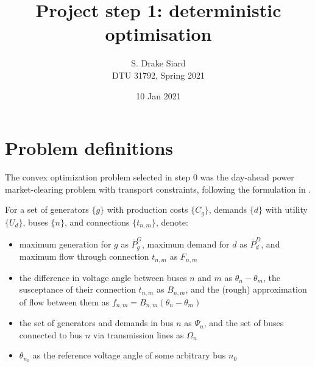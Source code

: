 \documentclass[11pt,a4paper]{article}
\title{\textbf{Project step 1: deterministic optimisation}}
\author{S. Drake Siard\\
DTU 31792, Spring 2021}
\date{10 Jan 2021}
\numberwithin{equation}{section}
\begin{document}
\newcommand{\pd}{\ensuremath{p^D_d}}
\newcommand{\ud}{\ensuremath{U_d}}
\newcommand{\pg}{\ensuremath{p^G_g}}
\newcommand{\cg}{\ensuremath{C_g}}
\newcommand{\bnm}{\ensuremath{B_{n,m}}}
\newcommand{\tnm}{\ensuremath{t_{n,m}}}
\newcommand{\fnm}{\ensuremath{f_{n,m}}}
\newcommand{\FNM}{\ensuremath{F_{n,m}}}
\newcommand{\PG}{\ensuremath{\overline{P}^G_g}}
\newcommand{\PD}{\ensuremath{\overline{P}^D_d}}

\newcommand{\mudup}{\ensuremath{\overline{\mu}_d^D}}
\newcommand{\muddown}{\ensuremath{\underline{\mu}_d^D}}
\newcommand{\mugup}{\ensuremath{\overline{\mu}_g^G}}
\newcommand{\mugdown}{\ensuremath{\underline{\mu}_g^G}}
\newcommand{\etaup}{\ensuremath{\overline{\eta}_{n,m}}}
\newcommand{\etadown}{\ensuremath{\underline{\eta}_{n,m}}}
\newcommand{\etaupm}{\ensuremath{\overline{\eta}_{m,n}}}
\newcommand{\etadownm}{\ensuremath{\underline{\eta}_{m,n}}}

\maketitle

\section{Problem definitions}

The convex optimization problem selected in step 0 was the day-ahead power market-clearing problem with transport constraints, following the formulation in \cite[pg. 11]{kazempourLectureMarketClearing2021}.

For a set of generators $\{g\}$ with production costs $\{\cg\}$, demands $\{d\}$ with utility $\{\ud\}$, buses $\{n\}$, and connections $\{\tnm\}$, denote:
 \begin{itemize}
\item maximum generation for $g$ as $\PG$, maximum demand for $d$ as $\PD$, and maximum flow through connection $\tnm$ as $\FNM$
\item the difference in voltage angle between buses $n$ and $m$ as $\theta_n - \theta_m$, the susceptance of their connection $\tnm$ as $\bnm$, and the (rough) approximation of flow between them as $\fnm = \bnm(\theta_n - \theta_m)$
\item the set of generators and demands in bus $n$ as $\Psi_n$, and the set of buses connected to bus $n$ via transmission lines as $\Omega_n$
\item $\theta_{n_0}$ as the reference voltage angle of some arbitrary bus $n_0$
\end{itemize}
\end{document}
